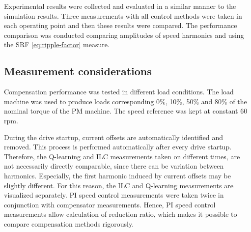 Experimental results were collected and evaluated in a similar manner to the simulation results. Three measurements with all control methods were taken in each operating point and then these results were compared. The performance comparison was conducted comparing amplitudes of speed harmonics and using the SRF \eqref{eq:ripple-factor} measure.

\subsection{Measurement considerations}

Compensation performance was tested in different load conditions. The load machine was used to produce loads corresponding 0\%, 10\%, 50\% and 80\% of the nominal torque of the PM machine. The speed reference was kept at constant $60$ rpm.


During the drive startup, current offsets are automatically identified and removed. This process is performed automatically after every drive startup. Therefore, the Q-learning and ILC measurements taken on different times, are not necessarily directly comparable, since there can be variation between harmonics. Especially, the first harmonic induced by current offsets may be slightly different. For this reason, the ILC and Q-learning measurements are visualized separately. PI speed control measurements were taken twice in conjunction with compensator measurements. Hence, PI speed control measurements allow calculation of reduction ratio, which makes it possible to compare compensation methods rigorously.


